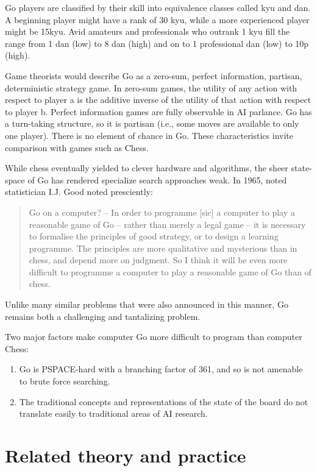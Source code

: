 \documentclass{memoir}
\begin{document}
Go players are classified by their skill into equivalence classes called kyu and dan. A beginning player might have a rank of 30 kyu, while a more experienced player might be 15kyu. Avid amateurs and professionals who outrank 1 kyu fill the range from 1 dan (low) to 8 dan (high) and on to 1 professional dan (low) to 10p (high).

Game theorists would describe Go as a zero-sum, perfect information, partisan, deterministic strategy game. In zero-sum games, the utility of any action with respect to player a is the additive inverse of the utility of that action with respect to player b. Perfect information games are fully observable in AI parlance. Go has a turn-taking structure, so it is partisan (i.e., some moves are available to only one player). There is no element of chance in Go. These characteristics invite comparison with games such as Chess.

While chess eventually yielded to clever hardware and algorithms, the sheer state-space of Go has rendered specialize search approaches weak. In 1965, noted statistician I.J. Good noted presciently:

\begin{quote}
Go on a computer? – In order to programme [sic] a computer to play a reasonable game of Go – rather than merely a legal game – it is necessary to formalise the principles of good strategy, or to design a learning programme. The principles are more qualitative and mysterious than in chess, and depend more on judgment. So I think it will be even more difficult to programme a computer to play a reasonable game of Go than of chess. \cite{Good65}
\end{quote}

Unlike many similar problems that were also announced in this manner, Go remains both a challenging and tantalizing problem.

Two major factors make computer Go more difficult to program than computer Chess:
\begin{enumerate}
  \item Go is PSPACE-hard with a branching factor of 361, and so is not amenable to brute force searching.
  \item The traditional concepts and representations of the state of the board do not translate easily to traditional areas of AI research.
\end{enumerate}

\chapter{Related theory and practice}
\end{document}
